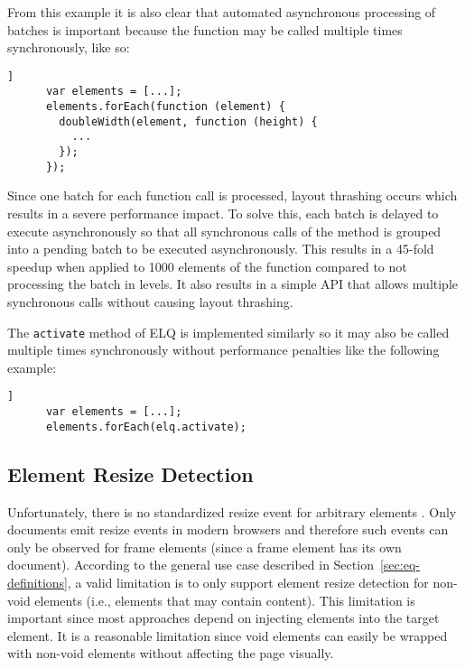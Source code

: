 \documentclass{acm_proc_article-sp}
\newcommand{\code}[1]{\texttt{#1}}
\newcommand{\elq}{ELQ}
\newcommand{\gls}[1]{#1}
\begin{document}
    From this example it is also clear that automated asynchronous processing of batches is important because the function may be called multiple times synchronously, like so:

    \begin{lstlisting}[gobble=6,label={},caption={},captionpos=b]]
      var elements = [...];
      elements.forEach(function (element) {
        doubleWidth(element, function (height) {
          ...
        });
      });
    \end{lstlisting}

    Since one batch for each function call is processed, layout thrashing occurs which results in a severe performance impact.
    To solve this, each batch is delayed to execute asynchronously so that all synchronous calls of the method is grouped into a pending batch to be executed asynchronously.
    This results in a 45-fold speedup when applied to 1000 elements of the function compared to not processing the batch in levels.
    It also results in a simple API that allows multiple synchronous calls without causing layout thrashing.

    The \code{activate} method of \elq{} is implemented similarly so it may also be called multiple times synchronously without performance penalties like the following example:

    \begin{lstlisting}[gobble=6,label={},caption={},captionpos=b]]
      var elements = [...];
      elements.forEach(elq.activate);
    \end{lstlisting}
  
  \subsection{Element Resize Detection}\label{sec:imp_erd}
    Unfortunately, there is no standardized resize event for arbitrary elements \cite{w3c_dom2_events}.
    Only documents emit resize events in modern browsers and therefore such events can only be observed for frame elements (since a frame \gls{element} has its own \gls{document}).
    According to the general use case described in Section~\ref{sec:eq-definitions}, a valid limitation is to only support \gls{element} resize detection for non-void elements (i.e., elements that may contain content).
    This limitation is important since most approaches depend on injecting elements into the target \gls{element}.
    It is a reasonable limitation since void elements can easily be wrapped with non-void elements without affecting the page visually.
\end{document}
